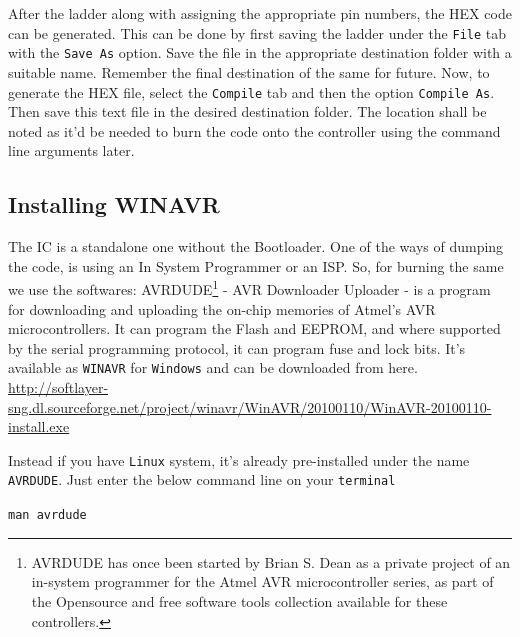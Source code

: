 \documentclass[12pt]{article}
\begin{document}
\vspace{12pt}After the ladder along with assigning the appropriate pin numbers, the HEX code can be generated. This can be done by first saving the ladder under the \texttt{File} tab with the \texttt{Save As} option. Save the file in the appropriate destination folder with a suitable name. Remember the final destination of the same for future. Now, to generate the HEX file, select the \texttt{Compile} tab and then the option \texttt{Compile As}. Then save this text file in the desired destination folder. The location shall be noted as it'd be needed to burn the code onto the controller using the command line arguments later.
{\large \subsection{Installing WINAVR}}

The IC is a standalone one without the Bootloader. One of the ways of dumping the code, is using an In System Programmer or an ISP. So, for burning the same we use the softwares:
AVRDUDE\footnote{AVRDUDE has once been started by Brian S. Dean as a private project of an in-system programmer for the Atmel AVR microcontroller series, as part of the Opensource and free software tools collection available for these controllers.} - AVR Downloader Uploader - is a program for downloading and uploading the on-chip memories of Atmel’s AVR microcontrollers. It can program the Flash and EEPROM, and where supported by the serial programming protocol, it can program fuse and lock bits. It's available as \texttt{WINAVR} for \texttt{Windows} and can be downloaded from here.
\linebreak
\url{http://softlayer-sng.dl.sourceforge.net/project/winavr/WinAVR/20100110/WinAVR-20100110-install.exe}\vspace{12pt}


Instead if you have \texttt{Linux} system, it's already pre-installed under the name \texttt{AVRDUDE}. Just enter the below command line on your \texttt{terminal} \vspace{12pt}

\texttt{man avrdude}

\vspace{12pt}
\end{document}
